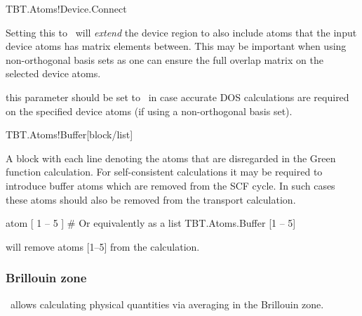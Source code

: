 \begin{fdflogicalF}{TBT.Atoms!Device.Connect}

  Setting this to \fdftrue\ will \emph{extend} the device region to
  also include atoms that the input device atoms has matrix
  elements between. This may be important when using non-orthogonal
  basis sets as one can ensure the full overlap matrix on the selected
  device atoms.
  
  \note this parameter should be set to \fdftrue\ in case accurate DOS
  calculations are required on the specified device atoms (if using a
  non-orthogonal basis set).

\end{fdflogicalF}

\begin{fdfentry}{TBT.Atoms!Buffer}[block/list]%

  A block with each line denoting the atoms that are disregarded in
  the Green function calculation.
  For self-consistent calculations it may be required to introduce
  buffer atoms which are removed from the SCF cycle. In such cases
  these atoms should also be removed from the transport calculation.
  \begin{fdfexample}
       atom [ 1 -- 5 ]
    # Or equivalently as a list   
    TBT.Atoms.Buffer [1 -- 5]
  \end{fdfexample}
  will remove atoms [1--5] from the calculation.
  
\end{fdfentry}


\subsubsection{Brillouin zone}

\tbtrans\ allows calculating physical quantities via averaging in the
Brillouin zone. 

